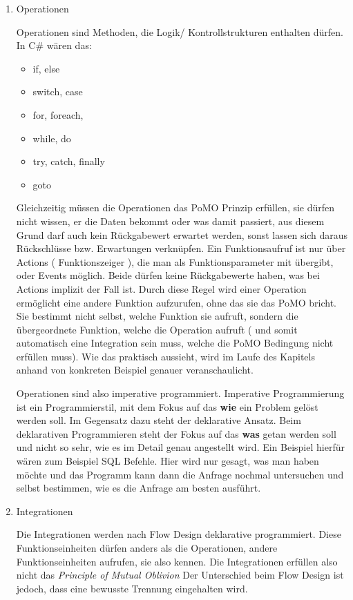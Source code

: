 \begin{enumerate}
\item Operationen




Operationen sind Methoden, die Logik/ Kontrollstrukturen enthalten dürfen. In C\# wären das:
\begin{itemize}
\item if, else
\item switch, case
\item for, foreach,
\item while, do
\item try, catch, finally
\item goto
\end{itemize}




Gleichzeitig müssen die Operationen das PoMO Prinzip erfüllen, sie dürfen nicht
wissen, er die Daten bekommt oder was damit passiert, aus diesem Grund darf auch
kein Rückgabewert erwartet werden, sonst lassen sich daraus Rückschlüsse bzw. Erwartungen verknüpfen.
Ein Funktionsaufruf ist nur über Actions ( Funktionszeiger ), die man als Funktionsparameter mit übergibt, oder Events möglich.
Beide dürfen keine Rückgabewerte haben, was bei Actions implizit der Fall ist.
Durch diese Regel wird einer Operation ermöglicht eine andere Funktion
aufzurufen, ohne das sie das PoMO bricht. Sie bestimmt nicht selbst, welche
Funktion sie aufruft, sondern die übergeordnete Funktion, welche die Operation
aufruft ( und somit automatisch eine Integration sein muss, welche die PoMO Bedingung nicht erfüllen muss).
Wie das praktisch aussieht, wird im Laufe des Kapitels anhand von konkreten
Beispiel genauer veranschaulicht.

Operationen sind also imperative programmiert. Imperative Programmierung ist ein Programmierstil,
mit dem Fokus auf das \textbf{wie} ein Problem gelöst werden soll.
Im Gegensatz dazu steht der deklarative Ansatz.
Beim deklarativen Programmieren steht der Fokus auf das \textbf{was} getan werden soll und nicht so sehr,
wie es im Detail genau angestellt wird. Ein Beispiel hierfür wären zum Beispiel SQL Befehle.
Hier wird nur gesagt, was man haben möchte und das Programm kann dann die Anfrage nochmal untersuchen
und selbst bestimmen, wie es die Anfrage am besten ausführt.

\item Integrationen


Die Integrationen werden nach Flow Design deklarative programmiert.
Diese Funktionseinheiten dürfen anders als die Operationen, andere Funktionseinheiten aufrufen, sie also kennen.
Die Integrationen erfüllen also nicht das \emph{Principle of Mutual Oblivion}
Der Unterschied beim Flow Design ist jedoch, dass eine bewusste Trennung eingehalten wird.


\end{enumerate}
